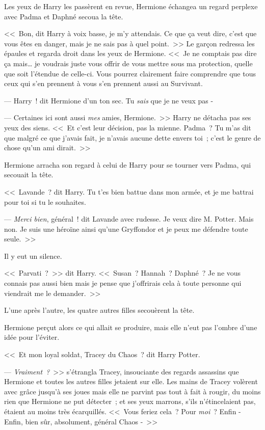 Les yeux de Harry les passèrent en revue, Hermione échangea un regard perplexe avec Padma et Daphné secoua la tête.

<<~Bon, dit Harry à voix basse, je m'y attendais. Ce que ça veut dire, c'est que vous êtes en danger, mais je ne sais pas à quel point.~>> Le garçon redressa les épaules et regarda droit dans les yeux de Hermione. <<~Je ne comptais pas dire ça mais… je voudrais juste vous offrir de vous mettre sous ma protection, quelle que soit l'étendue de celle-ci. Vous pourrez clairement faire comprendre que tous ceux qui s'en prennent à vous s'en prennent aussi au Survivant.

--- Harry~! dit Hermione d'un ton sec. Tu \emph{sais} que je ne veux pas -

--- Certaines ici sont aussi \emph{mes} amies, Hermione.~>> Harry ne détacha pas ses yeux des siens. <<~Et c'est leur décision, pas la mienne. Padma~? Tu m'as dit que malgré ce que j'avais fait, je n'avais aucune dette envers toi~; c'est le genre de chose qu'un ami dirait.~>>

Hermione arracha son regard à celui de Harry pour se tourner vers Padma, qui secouait la tête.

<<~Lavande~? dit Harry. Tu t'es bien battue dans mon armée, et je me battrai pour toi si tu le souhaites.

--- \emph{Merci bien}, général~! dit Lavande avec rudesse. Je veux dire M. Potter. Mais non. Je suis une héroïne ainsi qu'une Gryffondor et je peux me défendre toute seule.~>>

Il y eut un silence.

<<~Parvati~?~>> dit Harry. <<~Susan~? Hannah~? Daphné~? Je ne vous connais pas aussi bien mais je pense que j'offrirais cela à toute personne qui viendrait me le demander.~>>

L'une après l'autre, les quatre autres filles secouèrent la tête.

Hermione perçut alors ce qui allait se produire, mais elle n'eut pas l'ombre d'une idée pour l'éviter.

<<~Et mon loyal soldat, Tracey du Chaos~? dit Harry Potter.

--- \emph{Vraiment~?}~>> s'étrangla Tracey, insouciante des regards assassins que Hermione et toutes les autres filles jetaient sur elle. Les mains de Tracey volèrent avec grâce jusqu'à ses joues mais elle ne parvint pas tout à fait à rougir, du moins rien que Hermione ne put détecter~; et ses yeux marrons, s'ils n'étincelaient pas, étaient au moins très écarquillés. <<~Vous feriez cela~? Pour \emph{moi}~? Enfin - Enfin, bien sûr, absolument, général Chaos -~>>

